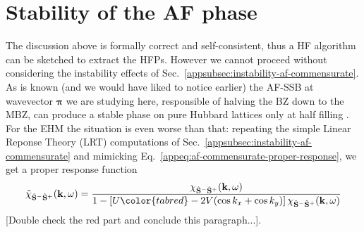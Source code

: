 
\section{Stability of the AF phase}

The discussion above is formally correct and self-consistent, thus a HF algorithm can be sketched to extract the HFPs. However we cannot proceed without considering the instability effects of Sec.~\ref{appsubsec:instability-af-commensurate}. As is known (and we would have liked to notice earlier) the AF-SSB at wavevector $\bm{\pi}$ we are studying here, responsible of halving the BZ down to the MBZ, can produce a stable phase on pure Hubbard lattices only at half filling \cite{singh1990collective}. For the EHM the situation is even worse than that: repeating the simple Linear Reponse Theory (LRT) computations of Sec.~\ref{appsubsec:instability-af-commensurate} and mimicking Eq.~\eqref{appeq:af-commensurate-proper-response}, we get a proper response function
\begin{equation}\label{eq:af-commensurate-proper-response}
	\tilde{\chi}_{\hat{\mathbf{S}}^- \hat{\mathbf{S}}^+}(\mathbf{k},\omega) = \frac{\chi_{\hat{\mathbf{S}}^- \hat{\mathbf{S}}^+}(\mathbf{k},\omega)}{1 - \left[ 
		U {\color{tabred} - 2V (\cos k_x + \cos k_y)}
	\right] \chi_{\hat{\mathbf{S}}^- \hat{\mathbf{S}}^+}(\mathbf{k},\omega)}
\end{equation}
{\color{tabred}[Double check the red part and conclude this paragraph...]}.

